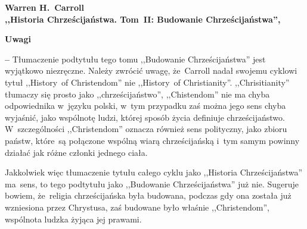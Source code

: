 \documentclass[a4paper,11pt]{article}  %
\newcommand{\tb}{\textbf}
\newcommand{\noi}{\noindent}
\newcommand{\start}{\noi \tb{--} {}}
\newcommand{\Center}[1]{\begin{center} #1 \end{center}}
\newcommand{\CenterTB}[1]{\Center{\tb{#1}}}
\newcommand{\Work}[1]{ \begin{center} {\large \tb{#1}} \end{center} }
\begin{document}
\Work{
  Warren H.~Carroll \\
  ,,Historia Chrześcijaństwa. Tom~II: Budowanie Chrześcijaństwa'',
  \cite{CarrollHistoriaChrzecijanstwaTomII10} }


\CenterTB{Uwagi}

\start Tłumaczenie podtytułu tego tomu ,,Budowanie Chrześcijaństwa''
jest wyjątkowo niezręczne. Należy zwrócić uwagę, że~Carroll nadał
swojemu cyklowi tytuł ,,History~of Christendom'' nie ,,History~of
Christianity''. ,,Chrisitianity'' tłumaczy się prosto jako
,,chrześcijaństwo'', ,,Chistendom'' nie ma chyba odpowiednika w~języku
polski, w~tym przypadku zaś można jego sens chyba wyjaśnić, jako
wspólnotę ludzi, której sposób życia definiuje chrześcijaństwo.
W~szczególności ,,Christendom'' oznacza również sens polityczny, jako
zbioru państw, które~są połączone wspólną wiarą chrześcijańską i~tym
samym powinny działać jak różne członki jednego ciała.

Jakkolwiek więc tłumaczenie tytułu całego cyklu jako ,,Historia
Chrześcijaństwa'' ma~sens, to tego podtytułu jako ,,Budowanie
Chrześcijaństwa'' już nie. Sugeruje bowiem, że~religia chrześcijańska
była budowana, podczas gdy ona została już wzniesiona przez Chrystusa,
zaś budowane było właśnie ,,Christendom'', wspólnota ludzka żyjąca jej
prawami.
\end{document}
